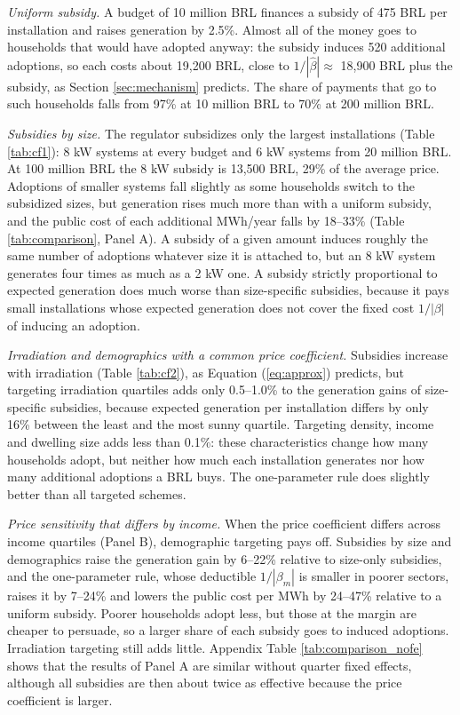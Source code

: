 \documentclass[final,3p,times,authoryear]{elsarticle}
\begin{document}
    

    \textit{Uniform subsidy.} A budget of 10 million BRL finances a subsidy of 475 BRL per installation and raises generation by 2.5\%. Almost all of the money goes to households that would have adopted anyway: the subsidy induces 520 additional adoptions, so each costs about 19,200 BRL, close to $1/|\hat\beta| \approx$ 18,900 BRL plus the subsidy, as Section \ref{sec:mechanism} predicts. The share of payments that go to such households falls from 97\% at 10 million BRL to 70\% at 200 million BRL.

    \textit{Subsidies by size.} The regulator subsidizes only the largest installations (Table \ref{tab:cf1}): 8 kW systems at every budget and 6 kW systems from 20 million BRL. At 100 million BRL the 8 kW subsidy is 13,500 BRL, 29\% of the average price. Adoptions of smaller systems fall slightly as some households switch to the subsidized sizes, but generation rises much more than with a uniform subsidy, and the public cost of each additional MWh/year falls by 18--33\% (Table \ref{tab:comparison}, Panel A). A subsidy of a given amount induces roughly the same number of adoptions whatever size it is attached to, but an 8 kW system generates four times as much as a 2 kW one. A subsidy strictly proportional to expected generation does much worse than size-specific subsidies, because it pays small installations whose expected generation does not cover the fixed cost $1/|\beta|$ of inducing an adoption.

    

    \textit{Irradiation and demographics with a common price coefficient.} Subsidies increase with irradiation (Table \ref{tab:cf2}), as Equation (\ref{eq:approx}) predicts, but targeting irradiation quartiles adds only 0.5--1.0\% to the generation gains of size-specific subsidies, because expected generation per installation differs by only 16\% between the least and the most sunny quartile. Targeting density, income and dwelling size adds less than 0.1\%: these characteristics change how many households adopt, but neither how much each installation generates nor how many additional adoptions a BRL buys. The one-parameter rule does slightly better than all targeted schemes.

    

    \textit{Price sensitivity that differs by income.} When the price coefficient differs across income quartiles (Panel B), demographic targeting pays off. Subsidies by size and demographics raise the generation gain by 6--22\% relative to size-only subsidies, and the one-parameter rule, whose deductible $1/|\beta_m|$ is smaller in poorer sectors, raises it by 7--24\% and lowers the public cost per MWh by 24--47\% relative to a uniform subsidy. Poorer households adopt less, but those at the margin are cheaper to persuade, so a larger share of each subsidy goes to induced adoptions. Irradiation targeting still adds little. Appendix Table \ref{tab:comparison_nofe} shows that the results of Panel A are similar without quarter fixed effects, although all subsidies are then about twice as effective because the price coefficient is larger.
\end{document}
